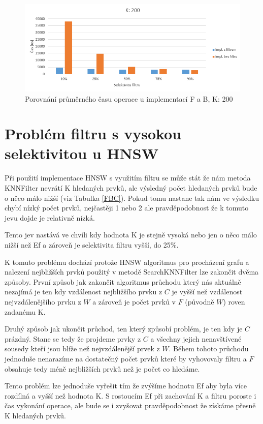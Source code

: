 \documentclass[czech,semestral,dept460,male,csharp,cpdeclaration]{diploma}
\begin{document}
		\begin{figure}
			\centering
			\includegraphics[scale=0.8]{Figures/graf_filtr_k200.png}
			\caption{Porovnání průměrného času operace u implementací F a B, K: 200}
			\label{graf_filtr_k200}
		\end{figure}
		
		\section{Problém filtru s vysokou selektivitou u HNSW}
		\label{FP}
		
			Při použití implementace HNSW s využitím filtru se může stát že nám metoda KNNFilter nevrátí K hledaných prvků, ale výsledný počet hledaných prvků bude o něco málo nižší (viz Tabulka \ref{FBC}). Pokud tomu nastane tak nám ve výsledku chybí nízký počet prvků, nejčastěji 1 nebo 2 ale pravděpodobnost že k tomuto jevu dojde je relativně nízká.
			
			Tento jev nastává ve chvíli kdy hodnota K je stejně vysoká nebo jen o něco málo nižší než Ef a zároveň je selektivita filtru vyšší, do 25\%.
			
			K tomuto problému dochází protože HNSW algoritmus pro procházení grafu a nalezení nejbližších prvků použitý v metodě SearchKNNFilter lze zakončit dvěma způsoby. První způsob jak zakončit algoritmus průchodu který nás aktuálně nezajímá je ten kdy vzdálenost nejbližšího prvku z $C$ je vyšší než vzdálenost nejvzdálenějšího prvku z $W$ a zároveň je počet prvků v $F$ (původně $W$) roven zadanému K.
			
			Druhý způsob jak ukončit průchod, ten který způsobí problém, je ten kdy je $C$ prázdný. Stane se tedy že projdeme prvky z $C$ a všechny jejich nenavštívené sousedy kteří jsou blíže než nejvzdálenější prvek z $W$. Během tohoto průchodu jednoduše nenarazíme na dostatečný počet prvků které by vyhovovaly filtru a $F$ obsahuje tedy méně nejbližších prvků než je počet co hledáme.
			
			Tento problém lze jednoduše vyřešit tím že zvýšíme hodnotu Ef aby byla více rozdílná a vyšší než hodnota K. S rostoucím Ef při zachování K a filtru poroste i čas vykonání operace, ale bude se i zvyšovat pravděpodobnost že získáme přesně K hledaných prvků.
	
\end{document}
